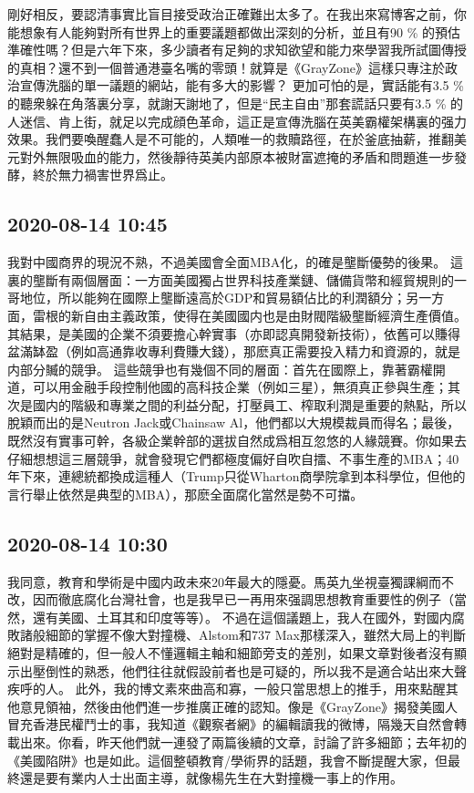 \documentclass[twocolumn]{ctexart}
\begin{document}
剛好相反，要認清事實比盲目接受政治正確難出太多了。在我出來寫博客之前，你能想象有人能夠對所有世界上的重要議題都做出深刻的分析，並且有90 \% 的預估準確性嗎？但是六年下來，多少讀者有足夠的求知欲望和能力來學習我所試圖傳授的真相？還不到一個普通港臺名嘴的零頭！就算是《GrayZone》這樣只專注於政治宣傳洗腦的單一議題的網站，能有多大的影響？
更加可怕的是，實話能有3.5 \% 的聽衆躲在角落裏分享，就謝天謝地了，但是“民主自由”那套謊話只要有3.5 \% 的人迷信、肯上街，就足以完成顔色革命，這正是宣傳洗腦在英美霸權架構裏的强力效果。我們要喚醒蠢人是不可能的，人類唯一的救贖路徑，在於釜底抽薪，推翻美元對外無限吸血的能力，然後靜待英美内部原本被財富遮掩的矛盾和問題進一步發酵，終於無力禍害世界爲止。
\subsection*{2020-08-14 10:45}

我對中國商界的現況不熟，不過美國會全面MBA化，的確是壟斷優勢的後果。
這裏的壟斷有兩個層面：一方面美國獨占世界科技產業鏈、儲備貨幣和經貿規則的一哥地位，所以能夠在國際上壟斷遠高於GDP和貿易額佔比的利潤額分；另一方面，雷根的新自由主義政策，使得在美國國内也是由財閥階級壟斷經濟生產價值。其結果，是美國的企業不須要擔心幹實事（亦即認真開發新技術），依舊可以賺得盆滿缽盈（例如高通靠收專利費賺大錢），那麽真正需要投入精力和資源的，就是内部分贓的競爭。
這些競爭也有幾個不同的層面：首先在國際上，靠著霸權開道，可以用金融手段控制他國的高科技企業（例如三星），無須真正參與生產；其次是國内的階級和專業之間的利益分配，打壓員工、榨取利潤是重要的熱點，所以脫穎而出的是Neutron Jack或Chainsaw Al，他們都以大規模裁員而得名；最後，既然沒有實事可幹，各級企業幹部的選拔自然成爲相互忽悠的人緣競賽。你如果去仔細想想這三層競爭，就會發現它們都極度偏好自吹自擂、不事生產的MBA；40年下來，連總統都換成這種人（Trump只從Wharton商學院拿到本科學位，但他的言行舉止依然是典型的MBA），那麽全面腐化當然是勢不可擋。
\subsection*{2020-08-14 10:30}

我同意，教育和學術是中國内政未來20年最大的隱憂。馬英九坐視臺獨課綱而不改，因而徹底腐化台灣社會，也是我早已一再用來强調思想教育重要性的例子（當然，還有美國、土耳其和印度等等）。
不過在這個議題上，我人在國外，對國内腐敗諸般細節的掌握不像大對撞機、Alstom和737 Max那樣深入，雖然大局上的判斷絕對是精確的，但一般人不懂邏輯主軸和細節旁支的差別，如果文章對後者沒有顯示出壓倒性的熟悉，他們往往就假設前者也是可疑的，所以我不是適合站出來大聲疾呼的人。
此外，我的博文素來曲高和寡，一般只當思想上的推手，用來點醒其他意見領袖，然後由他們進一步推廣正確的認知。像是《GrayZone》揭發美國人冒充香港民權鬥士的事，我知道《觀察者網》的編輯讀我的微博，隔幾天自然會轉載出來。你看，昨天他們就一連發了兩篇後續的文章，討論了許多細節；去年初的《美國陷阱》也是如此。這個整頓教育/學術界的話題，我會不斷提醒大家，但最終還是要有業内人士出面主導，就像楊先生在大對撞機一事上的作用。
\end{document}
